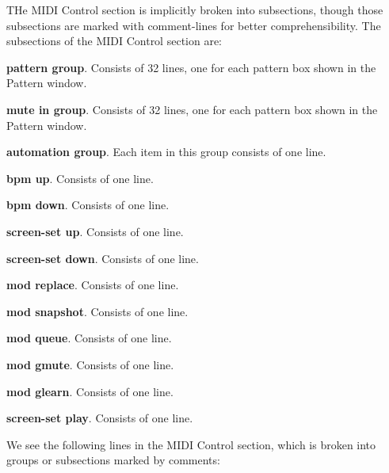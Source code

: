    THe MIDI Control section is implicitly broken into subsections, though those
   subsections are marked with comment-lines for better comprehensibility.
   The subsections of the MIDI Control section are:

   \begin{enumber}
      \item \textbf{pattern group}.  Consists of 32 lines, one for each
         pattern box shown in the Pattern window.
      \item \textbf{mute in group}.  Consists of 32 lines, one for each
         pattern box shown in the Pattern window.
      \item \textbf{automation group}.  Each item in this group consists of
         one line.
         \begin{enumber}
            \item \textbf{bpm up}. Consists of one line.
            \item \textbf{bpm down}. Consists of one line.
            \item \textbf{screen-set up}. Consists of one line.
            \item \textbf{screen-set down}. Consists of one line.
            \item \textbf{mod replace}. Consists of one line.
            \item \textbf{mod snapshot}. Consists of one line.
            \item \textbf{mod queue}. Consists of one line.
            \item \textbf{mod gmute}. Consists of one line.
            \item \textbf{mod glearn}. Consists of one line.
            \item \textbf{screen-set play}. Consists of one line.
         \end{enumber}
   \end{enumber}

   We see the following lines in the MIDI Control section, which is broken
   into groups or subsections marked by comments:

